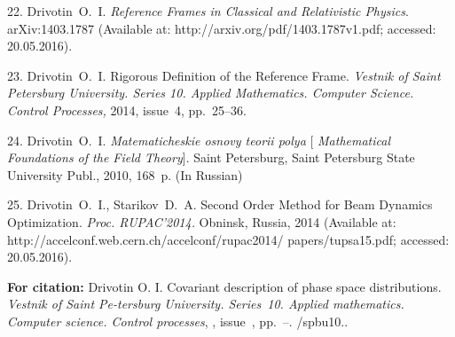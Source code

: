 {22. Drivotin~O.~I.
 {\it Reference Frames in Classical and Relativistic Physics}.
 arXiv:1403.1787
(Available at: http://arxiv.org/pdf/1403.1787v1.pdf; accessed:
20.05.2016).

23. Drivotin~O.~I.
 Rigorous Definition of the Reference Frame.
{\it Vestnik of Saint Petersburg University. Series 10. Applied
Mathematics. Computer Science. Control Processes,} 2014, issue~4,
pp.~25--36.

24. Drivotin~O.~I. {\it Matematicheskie osnovy teorii polya} [{\it
Mathematical Foundations of the Field Theory}]. Saint Petersburg,
  Saint Petersburg State University Publ., 2010, 168~p. (In
Russian)

25. Drivotin~O.~I., Starikov~D.~A. Second Order Method for Beam
Dynamics Optimization. {\it Proc. RUPAC'2014.} Obninsk, Russia,
2014 (Available at:
http://accelconf.web.cern.ch/accelconf/rupac2014/
papers/tupsa15.pdf; accessed: 20.05.2016).



\vskip 2mm

{\bf For citation:} Drivotin O. I. Covariant description of phase
space distributions. {\it Vestnik of Saint Pe-\linebreak tersburg
University. Series~10. Applied mathematics. Computer science.
Control processes}, \issueyear, issue~\issuenum,
pp.~\pageref{p4}--\pageref{p4e}.
\doivyp/spbu10.\issueyear.


}
